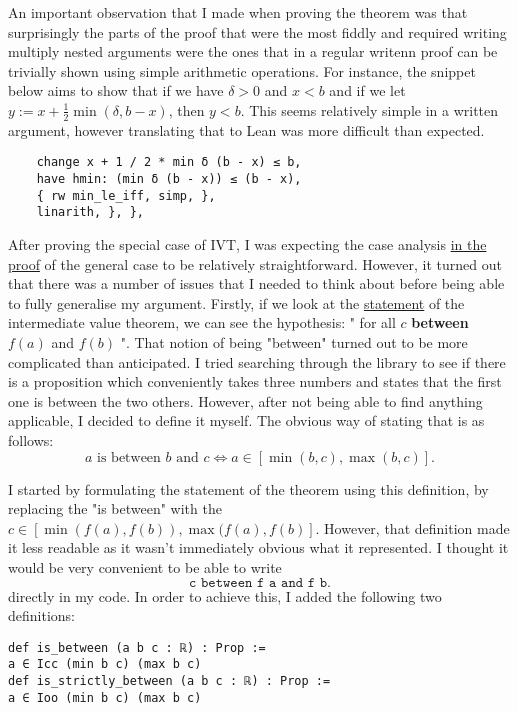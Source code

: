 \documentclass[11pt]{article}
\begin{document}
An important observation that I made when proving the theorem was that
surprisingly the parts of the proof that were the most fiddly and required
writing multiply nested arguments were the ones that in a regular writenn proof
can be trivially shown using simple arithmetic operations. For instance, the
snippet below aims to show that if we have $\delta > 0$ and $x < b$ and if we
let $y := x + \frac{1}{2}\min(\delta, b - x)$, then $y < b$. This seems
relatively simple in a written argument, however translating that to Lean was
more difficult than expected.

\begin{verbatim}
    change x + 1 / 2 * min δ (b - x) ≤ b,
    have hmin: (min δ (b - x)) ≤ (b - x),
    { rw min_le_iff, simp, },
    linarith, }, },
\end{verbatim}

After proving the special case of IVT, I was expecting the case analysis
\hyperlink{general_cases}{in the proof} of the general case to be relatively straightforward.
However, it turned out that there was a number of issues that I needed to think
about before being able to fully generalise my argument. Firstly, if we look at
the \hyperlink{statement}{statement} of the intermediate value theorem, we can
see the hypothesis: " for all $c$ \textbf{between}  $f(a)$ and $f(b)$ ". That
notion of being "between" turned out to be more complicated than anticipated.
I tried searching through the library to see if there is a proposition which
conveniently takes three numbers and states that the first one is between the
two others. However, after not being able to find anything applicable, I decided
to define it myself. The obvious way of stating that is as follows:
\[
  a \text{ is between } b \text{ and } c \iff a \in [\min(b, c), \max(b,c)]
.\]

I started by formulating the statement of the theorem using this definition, by
replacing the "is between" with the $c \in [\min(f(a), f(b)), \max(f(a),f(b)]$.
However, that definition made it less readable as it wasn't immediately obvious
what it represented. I thought it would be very convenient to be able to write
\[
\texttt{c between f a and f b}
.\]
directly in my code. In order to achieve this, I added the following two definitions:

\begin{verbatim}
def is_between (a b c : ℝ) : Prop :=
a ∈ Icc (min b c) (max b c)
def is_strictly_between (a b c : ℝ) : Prop :=
a ∈ Ioo (min b c) (max b c)
\end{verbatim}
\end{document}
